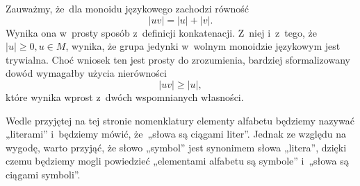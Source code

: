 \documentclass[a4paper,11pt]{article}
\begin{document}
Zauważmy, że~dla monoidu językowego zachodzi równość
\begin{equation}
  \label{eq:Forys-Forys-07}
  | u v | = | u | + | v |.
\end{equation}
Wynika ona w~prosty sposób z~definicji konkatenacji. Z~niej i~z~tego,
że~$| u | \geq 0, u \in M$, wynika, że grupa jedynki w~wolnym monoidzie
językowym jest trywialna. Choć wniosek ten jest prosty do zrozumienia,
bardziej sformalizowany dowód wymagałby użycia nierówności
\begin{equation}
  \label{eq:Forys-Forys-08}
  | u v | \geq | u |,
\end{equation}
które wynika wprost z~dwóch wspomnianych własności.

\vspace{\spaceFour}



\start {} Wedle przyjętej na tej stronie nomenklatury elementy
alfabetu będziemy nazywać „literami” i~będziemy mówić, że~„słowa są
ciągami liter”. Jednak ze względu na wygodę, warto przyjąć, że słowo
„symbol” jest synonimem słowa „litera”, dzięki czemu będziemy mogli
powiedzieć „elementami alfabetu są symbole” i~„słowa są ciągami
symboli”.

\vspace{\spaceFour}









\end{document}

